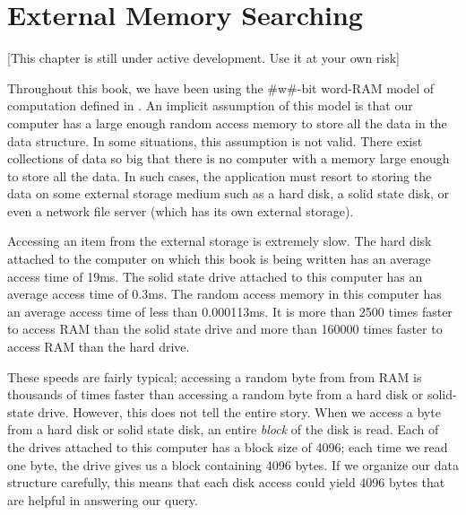 \chapter{External Memory Searching}

[This chapter is still under active development.  Use it at your own risk]

Throughout this book, we have been using the #w#-bit word-RAM model
of computation defined in .   An implicit assumption of
this model is that our computer has a large enough random access memory
to store all the data in the data structure.  In some situations, this
assumption is not valid.  There exist collections of data so big that
there is no computer with a memory large enough to store all the data.
In such cases, the application must resort to storing the data on some
external storage medium such as a hard disk, a solid state disk, or even
a network file server (which has its own external storage).

Accessing an item from the external storage is extremely slow.  The hard
disk attached to the computer on which this book is being written has
an average access time of 19ms.  The solid state drive attached to this
computer has an average access time of 0.3ms.  The random access memory in
this computer has an average access time of less than 0.000113ms.  It is
more than 2500 times faster to access RAM than the solid state drive
and more than 160000 times faster to access RAM than the hard drive.

% 
% 
% 

These speeds are fairly typical;  accessing a random byte from from RAM
is thousands of times faster than accessing a random byte from a hard
disk or solid-state drive.  However, this does not tell the entire story.
When we access a byte from a hard disk or solid state disk, an entire
\emph{block} of the disk is read.  Each of the drives attached to
this computer has a block size of 4096; each time we read one byte,
the drive gives us a block containing 4096 bytes.  If we organize our
data structure carefully, this means that each disk access could yield
4096 bytes that are helpful in answering our query.

